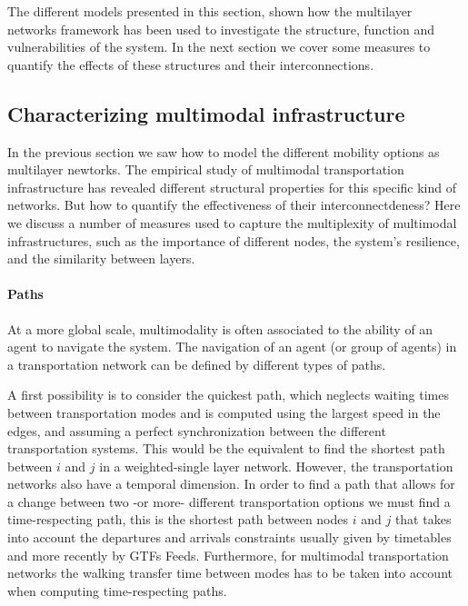 The different models presented in this section, shown how the multilayer networks framework has been used to investigate the structure, function and vulnerabilities of the system. In the next section we cover some measures to quantify the effects of these structures and their interconnections.

\subsection{Characterizing multimodal infrastructure}\label{sec:measuresinfrastructure}

In the previous section we saw how to model the different mobility options as multilayer newtorks. The empirical study of multimodal transportation infrastructure has revealed different structural properties for this specific kind of networks. But how to quantify the effectiveness of their interconnectdeness? Here we discuss a number of measures used to capture the multiplexity of multimodal infrastructures, such as the importance of different nodes, the system's resilience, and the similarity between layers.

\paragraph*{Paths} 
At a more global scale, multimodality is often associated to the ability of an agent to navigate the system. The navigation of an agent (or group of agents) in a transportation network can be defined by different types of paths.

A first possibility is to consider the quickest path, which neglects waiting times between transportation modes and is computed using the largest speed in the edges, and assuming a perfect synchronization between the different transportation systems. This would be the equivalent to find the shortest path between $i$ and $j$ in a weighted-single layer network. However, the transportation networks also have a temporal dimension. In order to find a path that allows for a change between two -or more- different transportation options we must find a time-respecting path, this is the shortest path between nodes $i$ and $j$ that takes into account the departures and arrivals constraints usually given by timetables and more recently by GTFs Feeds. Furthermore, for multimodal transportation networks the walking transfer time between modes has to be taken into account when computing time-respecting paths.

